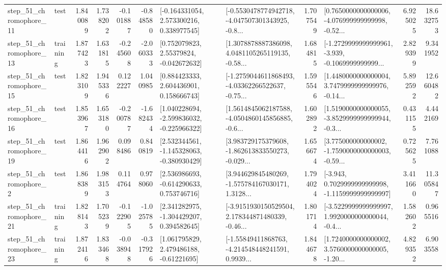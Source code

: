 \begin{tabular}{llrrrrllrlrr}
   step\_51\_chromophore\_11 &      test &      1.840089 &    1.738202 &     -0.101887 & -0.848580 &    [-0.164331054, 2.573300216, 0.338977545] &  [-0.5530478774942718, -4.047507301343925, -0.8... &       1.707549 &  [0.7650000000000006, -4.076999999999998, -0.52... &            6.925025 &         18.632753 \\
   step\_51\_chromophore\_13 &  training &      1.877423 &    1.631815 &     -0.245608 & -2.060333 &     [0.752079823, 2.55379824, -0.042672632] &  [1.3078878887386098, 4.0481105265119135, -0.58... &       1.684815 &  [-1.2729999999999961, -3.939, -0.1069999999999... &            2.829399 &          9.341952 \\
   step\_51\_chromophore\_15 &      test &      1.823109 &    1.945336 &      0.122227 &  1.040985 &     [0.884423333, 2.604436901, 0.158666743] &  [-1.2759044611868493, -4.03362266522637, -0.75... &       1.595546 &  [1.4480000000000004, 3.7479999999999976, -0.14... &            5.892592 &         12.660482 \\
   step\_51\_chromophore\_16 &      test &      1.853967 &    1.653180 &     -0.200787 & -1.682434 &   [1.040228694, -2.599836032, -0.225966322] &  [1.5614845062187588, -4.0504860145856885, -0.6... &       1.602892 &  [1.5190000000000055, -3.8529999999999944, -0.3... &            0.431155 &          4.442169 \\
   step\_51\_chromophore\_19 &      test &      1.864416 &    1.962902 &      0.098486 &  0.840819 &   [2.532344561, -1.145328063, -0.380930429] &  [3.983729175379608, -1.862613833550273, -0.029... &       1.656674 &  [3.775000000000002, -1.7590000000000003, -0.59... &            0.725625 &          7.761088 \\
    step\_51\_chromophore\_2 &      test &      1.868389 &    1.983153 &      0.114764 &  0.978060 &    [2.536986693, -0.614290633, 0.753746716] &  [3.944629845480269, -1.575784167030171, 1.3128... &       1.794024 &  [-3.943, 0.7029999999999998, -1.1159999999999997] &            3.411660 &         11.305847 \\
   step\_51\_chromophore\_21 &  training &      1.828143 &    1.705239 &     -0.122905 & -1.025785 &    [2.341282975, -1.304429207, 0.394582645] &  [-3.9151930150529504, 2.178344871480339, -0.46... &       1.801714 &  [-3.5229999999999997, 1.9920000000000044, -0.4... &            1.582602 &          0.965516 \\
   step\_51\_chromophore\_23 &  training &      1.872416 &    1.833468 &     -0.038948 & -0.317926 &     [1.061795829, 2.479486188, -0.61221695] &  [-1.55849411868763, -4.214548448241591, 0.9939... &       1.844678 &  [1.7240000000000002, 3.5760000000000005, -1.20... &            4.829352 &          6.903558 \\

\end{tabular}
